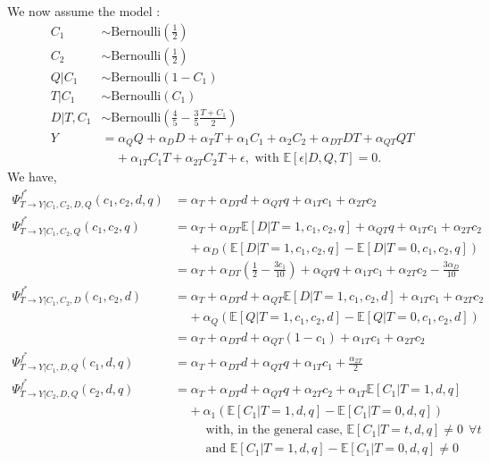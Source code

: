 \documentclass{article}
\theoremstyle{plain}
\theoremstyle{definition}
\theoremstyle{remark}
\newcommand{\effect}{\Psi}
\theoremstyle{mystyle}
\begin{document}
We now assume the model :
\begin{align*}
    C_1 &\sim \text{Bernoulli}(\frac{1}{2}) \\
    C_2 &\sim \text{Bernoulli}(\frac{1}{2}) \\
    Q | C_1 &\sim \text{Bernoulli}(1 - C_1) \\
    T | C_1 &\sim \text{Bernoulli}(C_1) \\
    D | T,C_1 &\sim \text{Bernoulli}(\frac{4}{5} - \frac{3}{5}\frac{T+C_1}{2}) \\
    Y &= \alpha_Q Q + \alpha_D D + \alpha_T T + \alpha_1 C_1 + \alpha_2 C_2 + \alpha_{DT} DT + \alpha_{QT} QT \\
    & \ \ \ \ \ + \alpha_{1T} C_1T + \alpha_{2T} C_2T   + \epsilon, \text{ with } \mathbb{E}[\epsilon | D, Q, T] = 0.
\end{align*}
We have,
\begin{align*}
    \effect^{f^*}_{T \rightarrow Y | C_1, C_2, D, Q}(c_1,c_2,d,q) &= \alpha_T + \alpha_{DT}d + \alpha_{QT}q + \alpha_{1T}c_1 + \alpha_{2T}c_2 \\
    \effect^{f^*}_{T \rightarrow Y | C_1, C_2, Q}(c_1,c_2,q) &= \alpha_T + \alpha_{DT}\mathbb{E}[D|T=1,c_1,c_2,q] + \alpha_{QT}q + \alpha_{1T}c_1 + \alpha_{2T}c_2 \\
    & \ \ \ \ \ + \alpha_D (\mathbb{E}[D|T=1,c_1,c_2,q] - \mathbb{E}[D|T=0,c_1,c_2,q]) \\
    &= \alpha_T + \alpha_{DT}(\frac{1}{2} - \frac{3c_1}{10}) + \alpha_{QT}q + \alpha_{1T}c_1 + \alpha_{2T}c_2 - \frac{3\alpha_D}{10} \\
    \effect^{f^*}_{T \rightarrow Y | C_1, C_2, D}(c_1,c_2,d) &= \alpha_T + \alpha_{DT}d + \alpha_{QT}\mathbb{E}[D|T=1,c_1,c_2,d] + \alpha_{1T}c_1 + \alpha_{2T}c_2 \\
    & \ \ \ \ \ + \alpha_Q (\mathbb{E}[Q|T=1,c_1,c_2,d] -  \mathbb{E}[Q|T=0,c_1,c_2,d]) \\
    &= \alpha_T + \alpha_{DT}d + \alpha_{QT}(1 - c_1) + \alpha_{1T}c_1 + \alpha_{2T}c_2 \\
    \effect^{f^*}_{T \rightarrow Y | C_1, D, Q}(c_1,d,q) &= \alpha_T + \alpha_{DT}d + \alpha_{QT}q + \alpha_{1T}c_1 + \frac{\alpha_{2T}}{2} \\
    \effect^{f^*}_{T \rightarrow Y | C_2, D, Q}(c_2,d,q) &= \alpha_T + \alpha_{DT}d + \alpha_{QT}q + \alpha_{2T}c_2 + \alpha_{1T}\mathbb{E}[C_1|T=1,d,q]\\
    & \ \ \ \ \ + \alpha_1(\mathbb{E}[C_1|T=1,d,q] - \mathbb{E}[C_1|T=0,d,q]) \\
    & \ \ \ \ \ \ \ \ \ \ \text{ with, in the general case, } \mathbb{E}[C_1|T=t,d,q] \neq 0 \ \ \forall t \\
    & \ \ \ \ \ \ \ \ \ \ \text{ and } \mathbb{E}[C_1|T=1,d,q] - \mathbb{E}[C_1|T=0,d,q] \neq 0
\end{align*}
\end{document}
